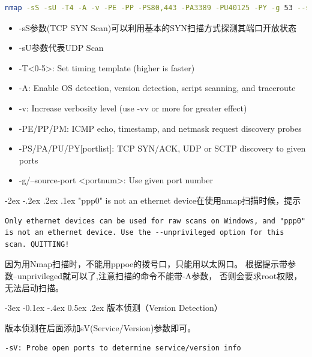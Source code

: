 \documentclass[12pt]{book}
\makeatletter
\numberwithin{dummy}{section}
\theoremstyle{ocrenumbox}
\theoremstyle{blacknumex}
\theoremstyle{blacknumbox}
\theoremstyle{ocrenum}
\renewcommand{\subsection}{\@startsection {subsection}{2}{\z@}
	{-3ex \@plus -0.1ex \@minus -.4ex}
	{0.5ex \@plus.2ex }
	{\normalfont\sffamily\bfseries}}
\renewcommand\paragraph{\@startsection{paragraph}{4}{\z@}
	{-2ex \@plus-.2ex \@minus .2ex}
	{.1ex}
	{\normalfont\small\sffamily\bfseries}}
\makeatother
\begin{document}
\begin{lstlisting}[language=Bash]
nmap -sS -sU -T4 -A -v -PE -PP -PS80,443 -PA3389 -PU40125 -PY -g 53 --script "default or (discovery and safe)" 12.26.32.14 
\end{lstlisting}

\begin{itemize}
	\item{-sS参数(TCP SYN Scan)可以利用基本的SYN扫描方式探测其端口开放状态}
	\item{-sU参数代表UDP Scan}
	\item{-T<0-5>: Set timing template (higher is faster)}
	\item{-A: Enable OS detection, version detection, script scanning, and traceroute}
	\item{-v: Increase verbosity level (use -vv or more for greater effect)}
	\item{-PE/PP/PM: ICMP echo, timestamp, and netmask request discovery probes}
	\item{-PS/PA/PU/PY[portlist]: TCP SYN/ACK, UDP or SCTP discovery to given ports}
	\item{-g/--source-port <portnum>: Use given port number}
\end{itemize}


\paragraph{"ppp0" is not an ethernet device}在使用nmap扫描时候，提示 

\begin{lstlisting}
Only ethernet devices can be used for raw scans on Windows, and "ppp0" is not an ethernet device. Use the --unprivileged option for this scan. QUITTING!
\end{lstlisting}

因为用Nmap扫描时，不能用pppoe的拨号口，只能用以太网口。
根据提示带参数--unprivileged就可以了,注意扫描的命令不能带-A参数，
否则会要求root权限，无法启动扫描。 


\subsection{版本侦测（Version Detection）}

版本侦测在后面添加sV(Service/Version)参数即可。

\begin{lstlisting}[language=Bash]
-sV: Probe open ports to determine service/version info
\end{lstlisting}
\end{document}

